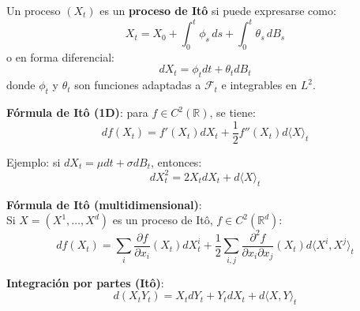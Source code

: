\begin{f}
	
	Un proceso \((X_t)\) es un \textbf{proceso de Itô} si puede expresarse como:
	\[
	X_t = X_0 + \int_0^t \phi_s\, ds + \int_0^t \theta_s\, dB_s
	\]
	o en forma diferencial:
	\[dX_t = \phi_t dt + \theta_t dB_t\]
	donde \(\phi_t\) y \(\theta_t\) son funciones adaptadas a \(\mathcal{F}_t\) e integrables en \(L^2\).
	
	\textbf{Fórmula de Itô (1D)}: para \(f \in C^2(\mathbb{R})\), se tiene:
	\[
	df(X_t) = f'(X_t) dX_t + \frac{1}{2} f''(X_t) d\langle X \rangle_t
	\]
	
	Ejemplo: si \(dX_t = \mu dt + \sigma dB_t\), entonces:
	\[
	dX_t^2 = 2X_t dX_t + d\langle X \rangle_t
	\]
	
	\textbf{Fórmula de Itô (multidimensional)}:\\
	Si \(X = (X^1, \dots, X^d)\) es un proceso de Itô, \(f \in C^2(\mathbb{R}^d)\):
	\[
	df(X_t) = \sum_i \frac{\partial f}{\partial x_i}(X_t) dX^i_t
	+ \frac{1}{2} \sum_{i,j} \frac{\partial^2 f}{\partial x_i \partial x_j}(X_t) d\langle X^i, X^j \rangle_t
	\]
	
	\textbf{Integración por partes (Itô)}:
	\[
	d(X_t Y_t) = X_t dY_t + Y_t dX_t + d\langle X, Y \rangle_t
	\]
	
\end{f}

